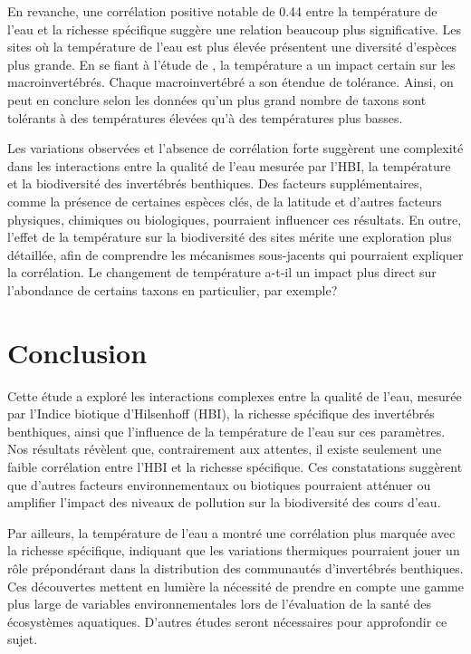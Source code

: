 \documentclass[cm,linguex]{glossa}
\begin{document}
En revanche, une corrélation positive notable de 0.44 entre la
température de l'eau et la richesse spécifique suggère une relation
beaucoup plus significative. Les sites où la température de l'eau est
plus élevée présentent une diversité d'espèces plus grande. En se fiant
à l'étude de \citet{bonacina_effects_2023}, la température a un impact
certain sur les macroinvertébrés. Chaque macroinvertébré a son étendue
de tolérance. Ainsi, on peut en conclure selon les données qu'un plus
grand nombre de taxons sont tolérants à des températures élevées qu'à
des températures plus basses.

Les variations observées et l'absence de corrélation forte suggèrent une
complexité dans les interactions entre la qualité de l'eau mesurée par
l'HBI, la température et la biodiversité des invertébrés benthiques. Des
facteurs supplémentaires, comme la présence de certaines espèces clés,
de la latitude et d'autres facteurs physiques, chimiques ou biologiques,
pourraient influencer ces résultats. En outre, l'effet de la température
sur la biodiversité des sites mérite une exploration plus détaillée,
afin de comprendre les mécanismes sous-jacents qui pourraient expliquer
la corrélation. Le changement de température a-t-il un impact plus
direct sur l'abondance de certains taxons en particulier, par exemple?

\hypertarget{conclusion}{%
\section{Conclusion}\label{conclusion}}

Cette étude a exploré les interactions complexes entre la qualité de
l'eau, mesurée par l'Indice biotique d'Hilsenhoff (HBI), la richesse
spécifique des invertébrés benthiques, ainsi que l'influence de la
température de l'eau sur ces paramètres. Nos résultats révèlent que,
contrairement aux attentes, il existe seulement une faible corrélation
entre l'HBI et la richesse spécifique. Ces constatations suggèrent que
d'autres facteurs environnementaux ou biotiques pourraient atténuer ou
amplifier l'impact des niveaux de pollution sur la biodiversité des
cours d'eau.

Par ailleurs, la température de l'eau a montré une corrélation plus
marquée avec la richesse spécifique, indiquant que les variations
thermiques pourraient jouer un rôle prépondérant dans la distribution
des communautés d'invertébrés benthiques. Ces découvertes mettent en
lumière la nécessité de prendre en compte une gamme plus large de
variables environnementales lors de l'évaluation de la santé des
écosystèmes aquatiques. D'autres études seront nécessaires pour
approfondir ce sujet.

\renewcommand\refname{Bibliographie}

\end{document}
